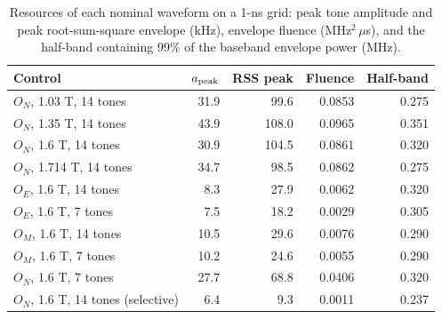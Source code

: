\begin{table}[htbp]
\centering
\small
\setlength{\tabcolsep}{4pt}
\caption{Resources of each nominal waveform on a 1-ns grid: peak tone amplitude and peak root-sum-square envelope (kHz), envelope fluence (MHz$^2\,\mu$s), and the half-band containing 99\% of the baseband envelope power (MHz).}\label{tab:resources}
\begin{tabular}{lrrrr}
\toprule
Control & $a_{\rm peak}$ & RSS peak & Fluence & Half-band \\
\midrule
$O_N$, 1.03 T, 14 tones & 31.9 & 99.6 & 0.0853 & 0.275 \\
$O_N$, 1.35 T, 14 tones & 43.9 & 108.0 & 0.0965 & 0.351 \\
$O_N$, 1.6 T, 14 tones & 30.9 & 104.5 & 0.0861 & 0.320 \\
$O_N$, 1.714 T, 14 tones & 34.7 & 98.5 & 0.0862 & 0.275 \\
$O_E$, 1.6 T, 14 tones & 8.3 & 27.9 & 0.0062 & 0.320 \\
$O_E$, 1.6 T, 7 tones & 7.5 & 18.2 & 0.0029 & 0.305 \\
$O_M$, 1.6 T, 14 tones & 10.5 & 29.6 & 0.0076 & 0.290 \\
$O_M$, 1.6 T, 7 tones & 10.2 & 24.6 & 0.0055 & 0.290 \\
$O_N$, 1.6 T, 7 tones & 27.7 & 68.8 & 0.0406 & 0.320 \\
$O_N$, 1.6 T, 14 tones (selective) & 6.4 & 9.3 & 0.0011 & 0.237 \\
\bottomrule
\end{tabular}
\end{table}
